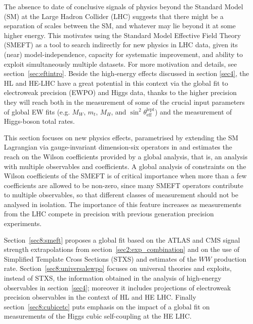 \documentclass[../report.tex]{subfiles}
\begin{document}
\label{sec8:globalfit}
\label{sec8}

The absence to date of conclusive signals of physics beyond the Standard Model (SM) at the Large Hadron Collider (LHC) suggests
that there might be a separation of scales between the SM, and whatever may lie beyond it at some higher energy.
This motivates using the Standard Model Effective Field Theory (SMEFT) as a tool to search indirectly for new physics in LHC data,
given its (near) model-independence, capacity for systematic improvement, and ability to exploit simultaneously multiple datasets. For more motivation and details, see section~\ref{sec:eftintro}.
Beside the high-energy effects discussed in section \ref{sec4}, the HL and HE-LHC have a great potential in this context via the global fit to electroweak precision (EWPO) and Higgs
data, thanks to the higher precision they will reach both in the
measurement of some of the crucial input parameters of global EW fits
(e.g. $M_W$, $m_t$, $M_H$, and
$\sin^2\theta_{\mathrm{eff}}^{\mathrm{lept}}$) and the measurement
of Higgs-boson total rates.




This section focuses  on new physics effects, parametrised by extending
the SM Lagrangian via gauge-invariant dimension-six operators in  and estimates the reach on the Wilson coefficients provided by a global analysis, that is, an analysis with multiple observables and coefficients.
A global analysis of constraints on the Wilson coefficients of the SMEFT is of critical importance when more than a few coefficients are allowed to be non-zero,
since many SMEFT operators contribute to multiple observables, so that different classes of measurement should not be analysed in isolation.
The importance of this feature increases as
measurements from the LHC compete in precision with previous generation precision experiments.

Section~\ref{sec8:smeft} proposes a global fit  based on the ATLAS and CMS signal strength extrapolations from section~\ref{sec2:exp_combination} and on the use of Simplified Template Cross Sections (STXS) and estimates of the $WW$ production rate. Section~\ref{sec8:universalewpo} focuses on universal theories and exploits, instead of STXS, the information obtained in the analysis of high-energy observables in section~\ref{sec4}; moreover it includes projections of electroweak precision observables in the context of HL and HE LHC. Finally section~\ref{sec8:cubicetc} puts emphasis on the impact of a global fit on measurements of the Higgs cubic self-coupling at the HE LHC.
\end{document}
